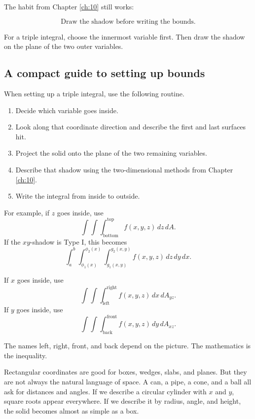 The habit from Chapter \ref{ch:10} still works:

\[
\boxed{
    \text{Draw the shadow before writing the bounds.}
}
\]

For a triple integral, choose the innermost variable first.  Then draw the shadow on the
plane of the two outer variables.

\subsection{A compact guide to setting up bounds}

When setting up a triple integral, use the following routine.

\begin{enumerate}
\item Decide which variable goes inside.

\item Look along that coordinate direction and describe the first and last surfaces hit.

\item Project the solid onto the plane of the two remaining variables.

\item Describe that shadow using the two-dimensional methods from Chapter
\ref{ch:10}.

\item Write the integral from inside to outside.
\end{enumerate}

For example, if \(z\) goes inside, use
\[
    \int\int\int_{\text{bottom}}^{\text{top}}
    f(x,y,z)\,dz\,dA.
\]
If the \(xy\)-shadow is Type I, this becomes
\[
    \int_a^b
    \int_{\phi_1(x)}^{\phi_2(x)}
    \int_{g_1(x,y)}^{g_2(x,y)}
    f(x,y,z)\,dz\,dy\,dx.
\]

If \(x\) goes inside, use
\[
    \int\int\int_{\text{left}}^{\text{right}}
    f(x,y,z)\,dx\,dA_{yz}.
\]
If \(y\) goes inside, use
\[
    \int\int\int_{\text{back}}^{\text{front}}
    f(x,y,z)\,dy\,dA_{xz}.
\]

The names left, right, front, and back depend on the picture.  The mathematics is the
inequality.

Rectangular coordinates are good for boxes, wedges, slabs, and planes.  But they are
not always the natural language of space.  A can, a pipe, a cone, and a ball all ask for
distances and angles.  If we describe a circular cylinder with \(x\) and \(y\), square
roots appear everywhere.  If we describe it by radius, angle, and height, the solid becomes
almost as simple as a box.


